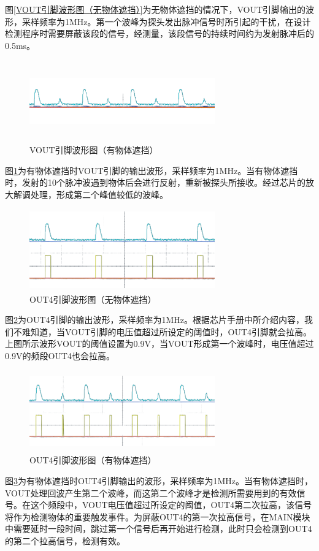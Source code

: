 图\ref{VOUT引脚波形图（无物体遮挡）}为无物体遮挡的情况下，VOUT引脚输出的波形，采样频率为1MHz。第一个波峰为探头发出脉冲信号时所引起的干扰，在设计检测程序时需要屏蔽该段的信号，经测量，该段信号的持续时间约为发射脉冲后的0.5ms。
\begin{figure}[!h]
	\centering
	\includegraphics[width=8cm,height=3.5cm]{figure/debug waveform6.png}
	\caption{VOUT引脚波形图（有物体遮挡）}
	\label{VOUT引脚波形图（有物体遮挡）}
\end{figure}\par
图\ref{VOUT引脚波形图（有物体遮挡）}为有物体遮挡时VOUT引脚的输出波形，采样频率为1MHz。当有物体遮挡时，发射的10个脉冲波遇到物体后会进行反射，重新被探头所接收。经过芯片的放大解调处理，形成第二个峰值较低的波峰。
\begin{figure}[!h]
	\centering
	\includegraphics[width=8cm,height=3.5cm]{figure/debug waveform7.png}
	\caption{OUT4引脚波形图（无物体遮挡）}
	\label{OUT4引脚波形图（无物体遮挡）}
\end{figure}\par
图\ref{OUT4引脚波形图（无物体遮挡）}为OUT4引脚的输出波形，采样频率为1MHz。根据芯片手册中所介绍内容，我们不难知道，当VOUT引脚的电压值超过所设定的阈值时，OUT4引脚就会拉高。上图所示波形VOUT的阈值设置为0.9V，当VOUT形成第一个波峰时，电压值超过0.9V的频段OUT4也会拉高。
\newpage
\begin{figure}[!h]
	\centering
	\includegraphics[width=8cm,height=3.5cm]{figure/debug wave form8.png}
	\caption{OUT4引脚波形图（有物体遮挡）}
	\label{OUT4引脚波形图（有物体遮挡）}
\end{figure}\par
图\ref{OUT4引脚波形图（有物体遮挡）}为有物体遮挡时OUT4引脚输出的波形，采样频率为1MHz。当有物体遮挡时，VOUT处理回波产生第二个波峰，而这第二个波峰才是检测所需要用到的有效信号。在这个频段中，VOUT电压值超过所设定的阈值，OUT4第二次拉高，该信号将作为检测物体的重要触发事件。为屏蔽OUT4的第一次拉高信号，在MAIN模块中需要延时一段时间，跳过第一个信号后再开始进行检测，此时只会检测到OUT4的第二个拉高信号，检测有效。



